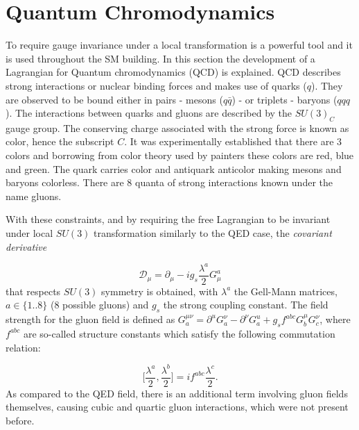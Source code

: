 \section{Quantum Chromodynamics}
\label{qcd}
To require gauge invariance under a local transformation is a powerful tool and it is used throughout the \gls{SM} building. In this section the development of a Lagrangian for Quantum chromodynamics (\gls{QCD}) is explained. \gls{QCD} describes strong interactions or nuclear binding forces and makes use of quarks ($q$). They are observed to be bound either in pairs - mesons ($q\bar{q}$) - or triplets - baryons ($qqq$). The interactions between quarks and gluons are described by the $SU(3)_{C}$ gauge group. The conserving charge associated with the strong force is known as color, hence the subscript $C$. It was experimentally established that there are 3 colors and borrowing from color theory used by painters these colors are red, blue and green. The quark carries color and antiquark anticolor making mesons and baryons colorless. There are 8 quanta of strong interactions known under the name gluons.

With these constraints, and by requiring the free Lagrangian to be invariant under local $SU(3)$ transformation similarly to the \gls{QED} case, the \textit{covariant derivative}

\begin{equation}
\mathcal{D}_{\mu} = \partial_{\mu} - ig_{s}\frac{\lambda^{a}}{2}G^{a}_{\mu}
\end{equation}
 that respects $SU(3)$ symmetry is obtained, with $\lambda^{a}$ the Gell-Mann matrices, $a\in\{1..8\}$ (8 possible gluons) and $g_{s}$ the strong coupling constant. The field strength for the gluon field is defined as $G_{a}^{\mu\nu}=\partial^{u}G_{a}^{\nu} - \partial^{\nu}G_{a}^{u} + g_{s}f^{abc}G_{b}^{\mu}G_{c}^{\nu}$, where $f^{abc}$ are so-called structure constants which satisfy the following commutation relation:

\begin{equation}
	\Big[\frac{\lambda^{a}}{2},\frac{\lambda^{b}}{2}\Big] = if^{abc}\frac{\lambda^{c}}{2}.
\end{equation}
As compared to the \gls{QED} field, there is an additional term involving gluon fields themselves, causing cubic and quartic gluon interactions, which were not present before.

